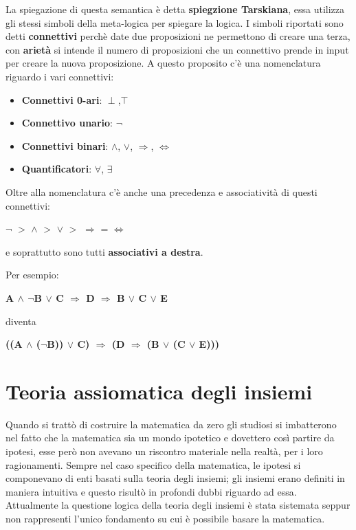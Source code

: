 \documentclass{article}
\begin{document}
La spiegazione di questa semantica è detta \textbf{spiegzione Tarskiana}, essa utilizza gli stessi simboli della meta-logica per spiegare la logica.
I simboli riportati sono detti \textbf{connettivi} perchè date due proposizioni ne permettono di creare una terza, con \textbf{arietà} si intende il numero di proposizioni che un connettivo prende in input per creare la nuova proposizione. A questo proposito c'è una nomenclatura riguardo i vari connettivi:
\begin{itemize}
    \item \textbf{Connettivi 0-ari}: $\perp$,$\top$
    \item \textbf{Connettivo unario}: $\neg$
    \item \textbf{Connettivi binari}: $\land$, $\lor$, $\Rightarrow$, $\Leftrightarrow$
    \item \textbf{Quantificatori}: $\forall$, $\exists$
\end{itemize}
Oltre alla nomenclatura c'è anche una precedenza e associatività di questi connettivi:
\begin{center}
  $\neg$ $>$ $\land$ $>$ $\lor$ $>$ $\Rightarrow$ = $\Leftrightarrow$

\end{center}

e soprattutto sono tutti \textbf{associativi a destra}.


Per esempio:

\begin{center}
\textbf{A $\land$ $\neg$B $\lor$ C $\Rightarrow$ D $\Rightarrow$ B $\lor$ C $\lor$ E }
\end{center}

diventa

\begin{center}
\textbf{((A $\land$ ($\neg$B)) $\lor$ C) $\Rightarrow$ (D $\Rightarrow$ (B $\lor$ (C $\lor$ E))) }
\end{center}


\section{Teoria assiomatica degli insiemi}
Quando si trattò di costruire la matematica da zero gli studiosi si imbatterono nel fatto che la matematica sia un mondo ipotetico e dovettero così partire da ipotesi, esse però non avevano un riscontro materiale nella realtà, per i loro ragionamenti. Sempre nel caso specifico della matematica, le ipotesi si componevano di enti basati sulla teoria degli insiemi; gli insiemi erano definiti in maniera intuitiva e questo risultò in profondi dubbi riguardo ad essa. Attualmente la questione logica della teoria degli insiemi è stata sistemata seppur non rappresenti l'unico fondamento su cui è possibile basare la matematica.
\end{document}
